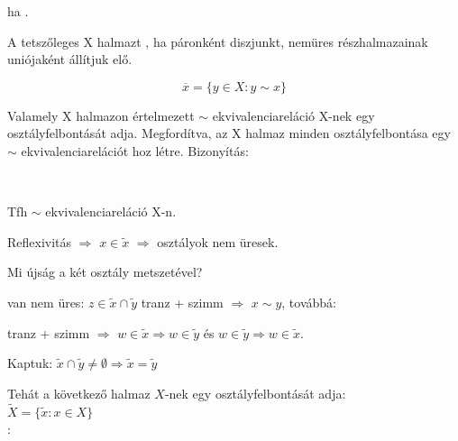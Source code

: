 \begin{frame}
\begin{tcolorbox}[title={Def.: Ekvivalenciareláció}]
ha .
\end{tcolorbox}

\begin{tcolorbox}[title={Def.: Halmaz osztályfelbontása}]
A tetszőleges X halmazt , ha páronként diszjunkt, nemüres részhalmazainak uniójaként állítjuk elő.
\end{tcolorbox}

\begin{tcolorbox}[title={Az x $\in$ X elem \textBF{ekvivalencia osztálya}:}]
$$\overline{x} = \{y \in X : y \sim x\}$$
\end{tcolorbox}

\begin{tcolorbox}[title={Tétel: Ekvivalenciareláció és osztályfelbontás kapcsolata}]
Valamely X halmazon értelmezett $\sim$ ekvivalenciareláció X-nek egy osztályfelbontását adja. Megfordítva, az X halmaz minden osztályfelbontása egy $\sim$ ekvivalenciarelációt hoz létre.
\tcblower
Bizonyítás:\\
\mmedskip

\\
\mmedskip

Tfh $\sim$ ekvivalenciareláció X-n.
\msmallskip

Reflexivitás $\Rightarrow$ $x \in \tilde{x}$ $\Rightarrow$ osztályok nem üresek.\\
\msmallskip

Mi újság a két osztály metszetével?\\
\msmallskip

 van nem üres: $z \in \tilde{x} \cap \tilde{y}$ tranz + szimm $\Rightarrow$ $x \sim y$, továbbá:\\
\msmallskip

tranz + szimm $\Rightarrow$ $w \in \tilde{x} \Rightarrow w \in \tilde{y}$ és $w \in \tilde{y} \Rightarrow w \in \tilde{x}$.
\msmallskip

Kaptuk: $\tilde{x} \cap \tilde{y} \neq \emptyset \Rightarrow \tilde{x} = \tilde{y}$
\mmedskip

Tehát a következő halmaz $X$-nek egy osztályfelbontását adja:\\
$\tilde{X} = \{ \tilde{x} : x \in X \}$\\

:\\
\mmedskip


\end{tcolorbox}
\end{frame}
